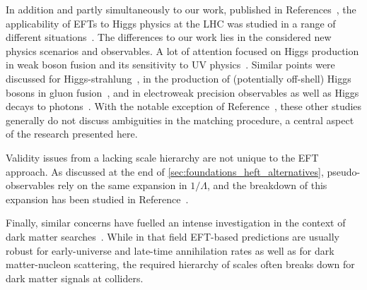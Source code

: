 
\newparagraph
%
In addition and partly simultaneously to our work, published in
References~\cite{Brehmer:2015rna, Biekotter:2016ecg}, the
applicability of EFTs to Higgs physics at the LHC was studied in a
range of different situations~\cite{Biekoetter:2014jwa,
  Arnesen:2008fb, Englert:2014cva, deVries:2014apa, Craig:2014una,
  Dawson:2015gka, Edezhath:2015lga, Gorbahn:2015gxa,
  Edelhaeuser:2015zra, Drozd:2015kva, Englert:2015hrx,
  Contino:2016jqw, Freitas:2016iwx, deFlorian:2016spz}. The
differences to our work lies in the considered new physics scenarios
and observables. A lot of attention focused on Higgs production in
weak boson fusion and its sensitivity to UV
physics~\cite{Alwall:2007ed, Hagiwara:2009wt, Englert:2012xt,
  Brehmer:2014pka}. Similar points were discussed for
Higgs-strahlung~\cite{Biekoetter:2014jwa}, in the production of
(potentially off-shell) Higgs bosons in gluon
fusion~\cite{Azatov:2014jga, Buschmann:2014sia, Dawson:2015gka,
  Drozd:2015kva, Azatov:2016xik}, and in electroweak precision
observables as well as Higgs decays to
photons~\cite{Freitas:2016iwx}. With the notable exception of
Reference~\cite{Freitas:2016iwx}, these other studies generally do not
discuss ambiguities in the matching procedure, a central aspect of the
research presented here.

Validity issues from a lacking scale hierarchy are not unique to the
EFT approach. As discussed at the end of
\autoref{sec:foundations_heft_alternatives}, pseudo-observables rely
on the same expansion in $1/\Lambda$, and the breakdown of this
expansion has been studied in Reference~\cite{Greljo:2015sla}.

Finally, similar concerns have fuelled an intense investigation in the
context of dark matter searches~\cite{Shoemaker:2011vi,
  Busoni:2013lha, Buchmueller:2013dya, Busoni:2014sya, Racco:2015dxa,
  Bauer:2016pug}.  While in that field EFT-based predictions are
usually robust for early-universe and late-time annihilation rates as
well as for dark matter-nucleon scattering, the required hierarchy of
scales often breaks down for dark matter signals at colliders.




